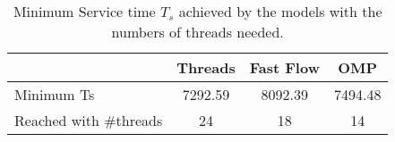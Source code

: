 \begin{table}[!h]
\centering
\begin{tabular}{lccc}
\hline
                       & Threads & Fast Flow & OMP     \\ \hline
Minimum Ts             & 7292.59 & 8092.39   & 7494.48 \\
Reached with \#threads & 24      & 18        & 14      \\ \hline
\end{tabular}
\caption{Minimum Service time $T_s$ achieved by the models with the numbers of threads needed.}
\label{table:minimum-service-time}
\end{table}